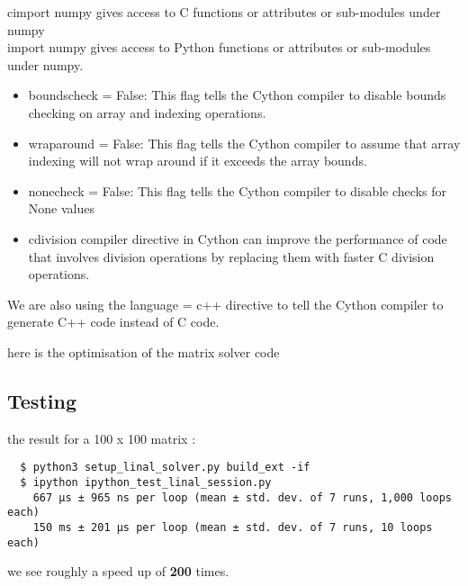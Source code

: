 \documentclass[titlepage, 11pt]{article}
\begin{document}
\begin{flushleft}
    cimport numpy gives access to C functions or attributes or sub-modules under numpy  \\
import numpy gives access to Python functions or attributes or sub-modules under numpy.
\end{flushleft}
\begin{itemize}
    \item boundscheck = False: This flag tells the Cython compiler to disable bounds checking on array and indexing operations.
    \item wraparound = False: This flag tells the Cython compiler to assume that array indexing will not wrap around if it exceeds the array bounds.

    \item nonecheck = False: This flag tells the Cython compiler to disable checks for None values
    \item cdivision compiler directive in Cython can improve the performance of code that involves division operations by replacing them with faster C division operations.
\end{itemize}
\begin{flushleft}
    We are also using the language = c++ directive to tell the Cython compiler to generate C++ code instead of C code. 
\end{flushleft}
here is the optimisation of the matrix solver code 

\subsection{Testing}

the result for a 100 x 100 matrix :
\begin{verbatim}
  $ python3 setup_linal_solver.py build_ext -if 
  $ ipython ipython_test_linal_session.py
    667 µs ± 965 ns per loop (mean ± std. dev. of 7 runs, 1,000 loops each) 
    150 ms ± 201 µs per loop (mean ± std. dev. of 7 runs, 10 loops each)
\end{verbatim}
\begin{flushleft}
    we see roughly a speed up of \textbf{200} times.
\end{flushleft}
\end{document}
